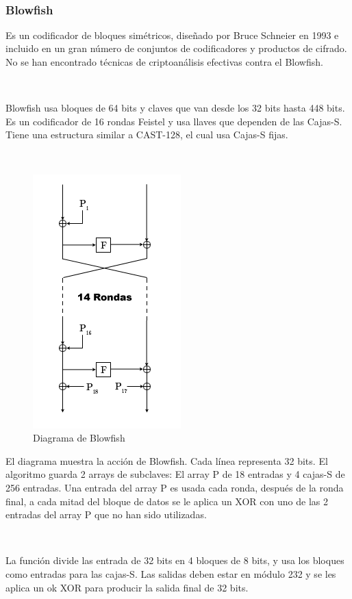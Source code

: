 \documentclass[11pt, conference]{IEEEtran}
\begin{document}
\

\subsubsection{Blowfish}
Es un codificador de bloques simétricos, diseñado por Bruce Schneier en 1993 e incluido en un gran número de conjuntos de codificadores y productos de cifrado. No se han encontrado técnicas de criptoanálisis efectivas contra el Blowfish.

\

Blowfish usa bloques de 64 bits y claves que van desde los 32 bits hasta 448 bits. Es un codificador de 16 rondas Feistel y usa llaves que dependen de las Cajas-S. Tiene una estructura similar a CAST-128, el cual usa Cajas-S fijas.

\


\begin{figure}[h]
	\begin{center}
		\includegraphics[scale=0.9]{DiagramaBlowfish.png}
		\caption{Diagrama de Blowfish} 
	\end{center}
\end{figure}

El diagrama muestra la acción de Blowfish. Cada línea representa 32 bits. El algoritmo guarda 2 arrays de subclaves: El array P de 18 entradas y 4 cajas-S de 256 entradas. Una entrada del array P es usada cada ronda, después de la ronda final, a cada mitad del bloque de datos se le aplica un XOR con uno de las 2 entradas del array P que no han sido utilizadas.

\

La función divide las entrada de 32 bits en 4 bloques de 8 bits, y usa los bloques como entradas para las cajas-S. Las salidas deben estar en módulo 232 y se les aplica un ok XOR para producir la salida final de 32 bits.
\end{document}

